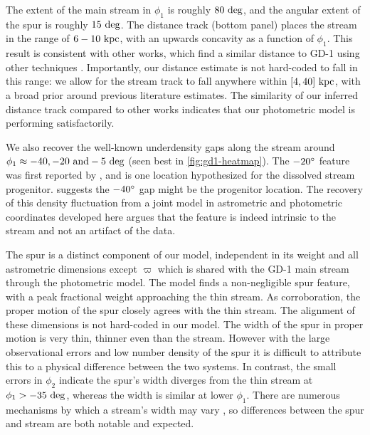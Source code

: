 \documentclass[twocolumn]{aastex631}
\newcommand{\stream}[1]{#1}
\newcommand{\parallax}{\varpi}
\begin{document}
        The extent of the main stream in $\phi_1$ is roughly $80~\rm{deg}$, and
        the angular extent of the spur is roughly $15~\rm{deg}$. The distance
        track (bottom panel) places the stream in the range of $6-10~\rm{kpc}$,
        with an upwards concavity as a function of $\phi_1$. This result is
        consistent with other works, which find a similar distance to
        \stream{GD-1} using other techniques \citep{deBoer+2020, Ibata+2021}.
        Importantly, our distance estimate is not hard-coded to fall in this
        range: we allow for the stream track to fall anywhere within
        $[4,40]~\rm{kpc}$, with a broad prior around previous literature
        estimates. The similarity of our inferred distance track compared to
        other works indicates that our photometric model is performing
        satisfactorily.

        We also recover the well-known underdensity gaps along the stream around
        $\phi_1 \approx -40, -20 \ \rm{and } -5~\rm{deg}$ (seen best in
        \autoref{fig:gd1-heatmap}). The $-20\degree$ feature was first reported
        by \citet{CarlbergGrillmair2013}, and is one location hypothesized for
        the dissolved stream progenitor. \citet{WebbBovy2019} suggests the
        $-40\degree$ gap might be  the progenitor location.  The recovery of
        this density fluctuation from a joint model in astrometric and
        photometric coordinates developed here argues that the feature is indeed
        intrinsic to the stream and not an artifact of the data.

        The spur is a distinct component of our model, independent in its weight
        and all astrometric dimensions except $\parallax$ which is shared with
        the \stream{GD-1} main stream through the photometric model. The model
        finds a non-negligible spur feature, with a peak fractional weight
        approaching the thin stream. As corroboration, the proper motion of the
        spur closely agrees with the thin stream. The alignment of these
        dimensions is not hard-coded in our model. The width of the spur in
        proper motion is very thin, thinner even than the stream.  However with
        the large observational errors and low number density of the spur it is
        difficult to attribute this to a physical difference between the two
        systems. In contrast, the small errors in $\phi_2$ indicate the spur's
        width diverges from the thin stream at $\phi_1 > -35 \ \rm{deg}$,
        whereas the width is similar at lower $\phi_1$. There are numerous
        mechanisms by which a stream's width may vary \citep[e.g.  epicyclic
        effects as in][]{Ibata+2020}, so differences between the spur and stream
        are both notable and expected. 
\end{document}
